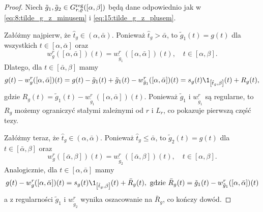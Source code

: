 \documentclass[oik, pdftex, man]{mgrwms}
\begin{document}
    \begin{proof}
        Niech $\tilde{g}_{1}, \tilde{g}_{2} \in G_{r, \varrho}^{\mathrm{reg}}([\alpha, \beta])$ będą dane odpowiednio jak w \eqref{eq:8:tilde_g_z_minusem} i \eqref{eq:15:tilde_g_z_plusem}.

        Załóżmy najpierw, że $\hat{t}_{g} \in (\alpha,\bar{\alpha})$.
        Ponieważ $\hat{t}_{g}>\bar{\alpha}$, to $\tilde{g}_{1}(t)=g(t)$ dla wszystkich $t \in[\alpha, \bar{\alpha}]$ oraz
        \begin{equation*}
            w_{g}^{r}([\alpha, \bar{\alpha}])(t)=w_{\tilde{g}_{1}}^{r}([\alpha, \bar{\alpha}])(t), \quad t \in[\alpha, \beta].
        \end{equation*}
        Dlatego, dla $t \in[\bar{\alpha}, \beta]$ mamy
        \begin{equation}
            g(t)-w_{g}^{r}([\alpha, \bar{\alpha}])(t)=g(t)-\tilde{g}_{1}(t)+\tilde{g}_{1}(t)-w_{\tilde{g}_{1}}^{r}([\alpha, \bar{\alpha}])(t)=s_{g}(t) \1_{\left[\hat{t}_{g}, \beta\right]}(t)+R_{g}(t),
        \end{equation}
        gdzie $R_{g}(t)=\tilde{g}_{1}(t)-w_{\tilde{g}_{1}}^{r}([\alpha, \bar{\alpha}])(t)$. Ponieważ $\tilde{g}_{1}$ i $w_{\tilde{g}_{1}}^{r}$ są regularne, to $R_{g}$ możemy ograniczyć stałymi zależnymi  od $r$ i $L_{r}$, co pokazuje pierwszą część tezy.

        Załóżmy teraz, że $\hat{t}_{g} \in (\alpha,\bar{\alpha})$.
        Ponieważ $\hat{t}_{g} \leq \bar{\alpha}$, to $\tilde{g}_{2}(t)=g(t)$ dla $t \in[\bar{\alpha}, \beta]$ oraz
        \begin{equation*}
            w_{g}^{r}([\bar{\alpha}, \beta])(t)=w_{\tilde{g}_{2}}^{r}([\bar{\alpha}, \beta])(t), \quad t \in[\alpha, \beta].
        \end{equation*}
        Analogicznie, dla $t \in [\alpha, \bar{\alpha}]$ mamy
        \begin{equation}
            g(t)-w_{g}^{r}([\alpha, \bar{\alpha}])(t)=s_{g}(t) \1_{\left[\hat{t}_{g}, \beta\right]}(t)+\bar{R}_{g}(t), \text{ gdzie } \bar{R}_{g}(t)=\tilde{g}_{1}(t)-w_{\tilde{g}_{1}}^{r}([\alpha, \bar{\alpha}])(t)
        \end{equation}
        a z regularności $\tilde{g}_{1}$ i $w_{\tilde{g}_{2}}^{r}$ wynika oszacowanie na $\bar{R}_{g}$, co kończy dowód.
    \end{proof}
\end{document}
